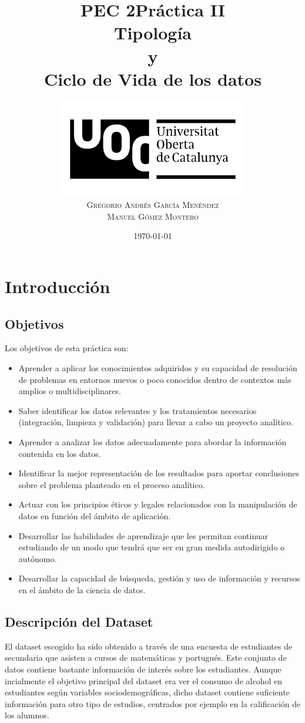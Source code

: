 \documentclass[12pt,a4paper]{article}
\title{PEC 2}
\title{Práctica II\\Tipología \\ y \\Ciclo de Vida de los datos \\} %
\author{%
		\protect\includegraphics[trim = 0mm 0mm 0mm 0mm, clip,scale=0.3]{images/uoc}\\ %
	\textsc{Gregorio Andrés García Menéndez} \\ %
	\textsc{ Manuel Gómez Montero}
}
\date{\today} %
\begin{document}
	\nocite{*}
	\maketitle
\tableofcontents
\clearpage

\section{Introducción}

\subsection{Objetivos}
Los objetivos de esta práctica son:
\begin{itemize}
\item Aprender a aplicar los conocimientos adquiridos y su capacidad de resolución de problemas en entornos nuevos o poco conocidos dentro de contextos más amplios o multidisciplinares.
\item Saber identificar los datos relevantes y los tratamientos necesarios (integración, limpieza y validación) para llevar a cabo un proyecto analítico.
\item Aprender a analizar los datos adecuadamente para abordar la información contenida en los datos.
\item Identificar la mejor representación de los resultados para aportar conclusiones sobre el problema planteado en el proceso analítico.
\item Actuar con los principios éticos y legales relacionados con la manipulación de datos en función del ámbito de aplicación.
\item Desarrollar las habilidades de aprendizaje que les permitan continuar estudiando de un modo que tendrá que ser en gran medida autodirigido o autónomo.
\item Desarrollar la capacidad de búsqueda, gestión y uso de información y recursos en el ámbito de la ciencia de datos.
\end{itemize}


\subsection{Descripción del Dataset}
El dataset escogido ha sido obtenido a través de una encuesta de estudiantes de secundaria que asisten a cursos de matemáticas y  portugués. Este conjunto de datos contiene bastante información de interés sobre los estudiantes. Aunque incialmente el objetivo principal del dataset era ver el consumo de alcohol en estudiantes según variables sociodemográficas, dicho dataset contiene suficiente información para otro tipo de estudios, centrados por ejemplo en la calificación de los alumnos.
\end{document}
